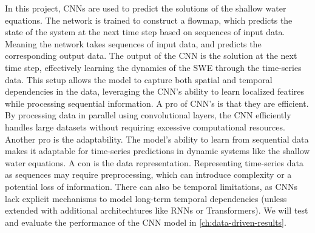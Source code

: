 In this project, CNNs are used to predict the solutions of the shallow water equations. 
The network is trained to construct a flowmap, which predicts the state of the system at the next time step based on sequences of input data.
Meaning the network takes sequences of input data, and predicts the corresponding output data.
The output of the CNN is the solution at the next time step, effectively learning the dynamics of the SWE through the time-series data.
This setup allows the model to capture both spatial and temporal dependencies in the data, leveraging the CNN's ability to learn localized featires while processing sequential information.
A pro of CNN's is that they are efficient. By processing data in parallel using convolutional layers, the CNN efficiently handles large datasets without requiring excessive computational resources.
Another pro is the adaptability. 
The model's ability to learn from sequential data makes it adaptable for time-series predictions in dynamic systems like the shallow water equations.
A con is the data representation. Representing time-series data as sequences may require preprocessing, which can introduce complexity or a potential loss of information.
There can also be temporal limitations, as CNNs lack explicit mechanisms to model long-term temporal dependencies (unless extended with additional architechtures like RNNs or Transformers).
We will test and evaluate the performance of the CNN model in \autoref{ch:data-driven-results}.





